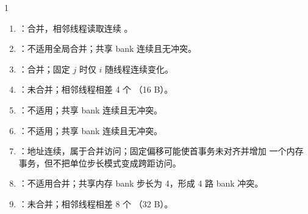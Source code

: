 \begin{solutionexercise}{1}
\answerheading
\begin{enumerate}[label=\alph*.,leftmargin=2.2em]
\item {}：合并，相邻线程读取连续 。
\item {}：不适用全局合并；共享 bank 连续且无冲突。
\item {}：合并；固定 $j$ 时仅 $i$ 随线程连续变化。
\item {}：未合并；相邻线程相差 4 个 （16 B）。
\item {}：不适用；共享 bank 连续且无冲突。
\item {}：不适用；共享 bank 连续且无冲突。
\item {}：地址连续，属于合并访问；固定偏移可能使首事务未对齐并增加
一个内存事务，但不把单位步长模式变成跨距访问。
\item {}：不适用合并；共享内存 bank 步长为 4，形成
4 路 bank 冲突。
\item {}：未合并；相邻线程相差 8 个 （32 B）。
\end{enumerate}


\end{solutionexercise}
